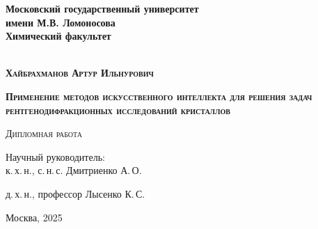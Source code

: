 \begin{titlepage}
\newpage

\begin{center}

\textbf{Московский государственный университет\\ имени М.В. Ломоносова}\\
\textbf{Химический факультет}\\
\\
\end{center}
\vspace{1cm}


\vspace{8em}
\begin{center}
\textsc{\textbf{Хайбрахманов Артур Ильнурович}}
\vspace{1cm}


\textsc{\textbf{\large Применение методов искусственного интеллекта для решения задач рентгенодифракционных исследований кристаллов}}


\vspace{1em}

\textsc{Дипломная работа}
\end{center}
\vspace{7em}
\begin{flushright}
Научный руководитель:\\
к.\,х.\,н., с.\,н.\,с. Дмитриенко А.\,О.

д.\,х.\,н., профессор Лысенко К.\,С.

\end{flushright}

\vspace{\fill}

\begin{center}
Москва, 2025
\end{center}

\end{titlepage}
